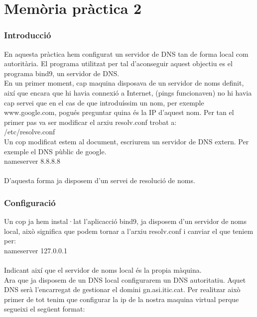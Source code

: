 \documentclass[11p]{article}
\begin{document}
\part*{Memòria pràctica 2}
\section{Introducció}

En aquesta pràctica hem configurat un servidor de DNS tan de forma local com autoritària. El programa utilitzat per tal d'aconseguir aquest objectiu es el programa bind9, un servidor de DNS. \\


En un primer moment, cap maquina disposava de un servidor de noms definit, així que encara que hi havia connexió a  Internet, (pings funcionaven) no hi havia cap servei que en el cas de que introduíssim un nom, per exemple www.google.com, pogués preguntar quina és la IP d'aquest nom.
Per tan el primer pas va ser modificar el arxiu resolv.conf trobat a:\\ 	
	/etc/resolve.conf\\		
Un cop modificat estem al document, escriurem un servidor de DNS extern. Per exemple el DNS pùblic de google.\\

	nameserver 8.8.8.8 \\
	\\
D'aquesta forma ja disposem d'un servei de resolució de noms.

\section{Configuració}

Un cop ja hem instal·lat l'aplicacció bind9, ja disposem d'un servidor de noms local, això significa que podem tornar a l'arxiu resolv.conf i canviar el que teniem per:\\

	nameserver 127.0.0.1\\
	\\
Indicant així que el servidor de noms local és la propia màquina.\\

Ara que ja disposem de un DNS local configurarem un DNS autoritatiu. Aquet DNS serà l'encarregat de gestionar el domini gn.asi.itic.cat. Per realitzar això primer de tot tenim que configurar la ip de la nostra maquina virtual perque segueixi el següent format:\\
\end{document}
